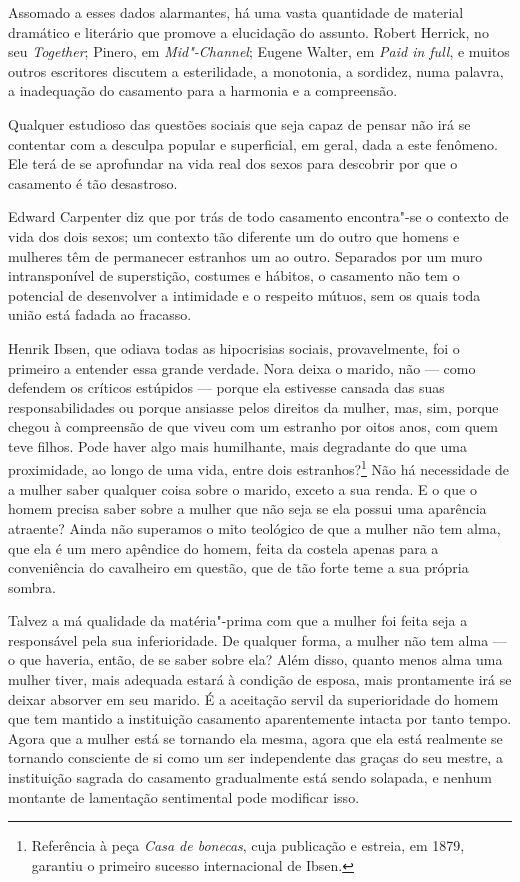 Assomado a esses dados alarmantes, há uma vasta quantidade de material
dramático e literário que promove a elucidação do assunto. Robert
Herrick, no seu \emph{Together}; Pinero, em \emph{Mid"-Channel}; Eugene
Walter, em \emph{Paid in full}, e muitos outros escritores discutem a
esterilidade, a monotonia, a sordidez, numa palavra, a inadequação do
casamento para a harmonia e a compreensão.

Qualquer estudioso das questões sociais que seja capaz de pensar não irá
se contentar com a desculpa popular e superficial, em geral, dada a este fenômeno. Ele
terá de se aprofundar na vida real dos sexos para descobrir por que o
casamento é tão desastroso.

Edward Carpenter diz que por trás de todo casamento encontra"-se o
contexto de vida dos dois sexos; um contexto tão diferente um do outro
que homens e mulheres têm de permanecer estranhos um ao outro.
Separados por um muro intransponível de superstição, costumes e hábitos,
o casamento não tem o potencial de desenvolver a intimidade e o
respeito mútuos, sem os quais toda união está fadada ao fracasso.

Henrik Ibsen, que odiava todas as hipocrisias sociais, provavelmente,
foi o primeiro a entender essa grande verdade. Nora deixa o marido,
não --- como defendem os críticos estúpidos --- porque ela estivesse
cansada das suas responsabilidades ou porque ansiasse pelos direitos da
mulher, mas, sim, porque chegou à compreensão de que viveu com um
estranho por oitos anos, com quem teve filhos. Pode haver algo mais
humilhante, mais degradante do que uma proximidade, ao longo de uma
vida, entre dois estranhos?\footnote{Referência à peça \textit{Casa de bonecas}, cuja publicação e estreia, em 1879, garantiu o primeiro sucesso internacional de Ibsen.} Não há necessidade de a mulher saber
qualquer coisa sobre o marido, exceto a sua renda. E o que o homem
precisa saber sobre a mulher que não seja se ela possui uma aparência
atraente? Ainda não superamos o mito teológico de que a mulher não tem
alma, que ela é um mero apêndice do homem, feita da costela apenas para
a conveniência do cavalheiro em questão, que de tão forte teme a sua
própria sombra.

Talvez a má qualidade da matéria"-prima com que a mulher foi feita seja a
responsável pela sua inferioridade. De qualquer forma, a mulher não tem
alma --- o que haveria, então, de se saber sobre ela? Além disso, quanto
menos alma uma mulher tiver, mais adequada estará à condição de esposa,
mais prontamente irá se deixar absorver em seu marido. É a aceitação
servil da superioridade do homem que tem mantido a instituição casamento
aparentemente intacta por tanto tempo. Agora que a mulher está se
tornando ela mesma, agora que ela está realmente se tornando consciente
de si como um ser independente das graças do seu mestre, a instituição
sagrada do casamento gradualmente está sendo solapada, e nenhum montante
de lamentação sentimental pode modificar isso.

